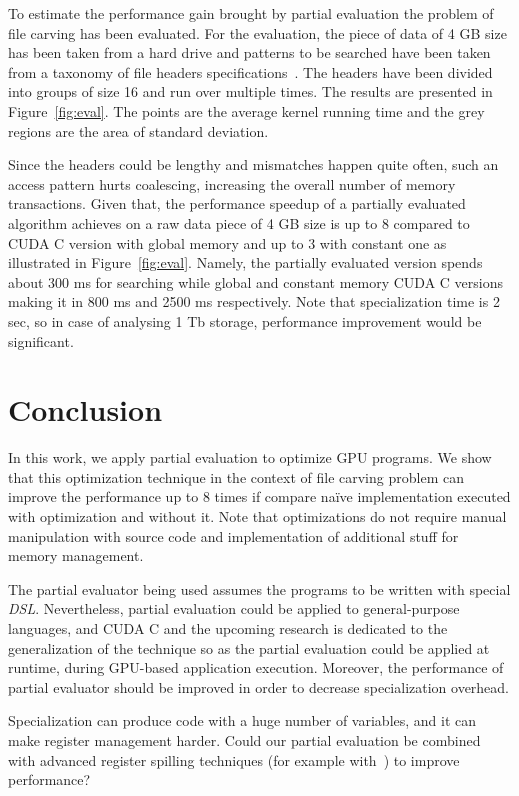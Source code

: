 \documentclass[sigplan,review,anonymous]{acmart}\settopmatter{printfolios=true,printccs=false,printacmref=false}
\begin{document}
To estimate the performance gain brought by partial evaluation the problem of file carving has been evaluated.
For the evaluation, the piece of data of 4 GB size has been taken from a hard drive and patterns to be searched have been taken from a taxonomy of file headers specifications~\cite{Headers}.
The headers have been divided into groups of size 16 and run over multiple times.
The results are presented in Figure~\ref{fig:eval}.
The points are the average kernel running time and the grey regions are the area of standard deviation.   

Since the headers could be lengthy and mismatches happen quite often, such an access pattern hurts coalescing, increasing the overall number of memory transactions. 
Given that, the performance speedup of a partially evaluated algorithm achieves on a raw data piece of 4 GB size is up to $8$ compared to CUDA C version with global memory and up to $3$ with constant one as illustrated in Figure~\ref{fig:eval}. Namely, the partially evaluated version spends about 300 ms for searching while global and constant memory CUDA C versions making it in 800 ms and 2500 ms respectively.  
Note that specialization time is 2 sec, so in case of analysing 1 Tb storage, performance improvement would be significant. 


\section{Conclusion}
In this work, we apply partial evaluation to optimize GPU programs.
We show that this optimization technique in the context of file carving problem can improve the performance up to $8$ times if compare na\"ive implementation executed with optimization and without it.
Note that optimizations do not require manual manipulation with source code and implementation of additional stuff for memory management.
  
The partial evaluator being used assumes the programs to be written with special \textit{DSL}.
Nevertheless, partial evaluation could be applied to general-purpose languages, and CUDA C and the upcoming research is dedicated to the generalization of the technique so as the partial evaluation could be applied at runtime, during GPU-based application execution.
Moreover, the performance of partial evaluator should be improved in order to decrease specialization overhead.

Specialization can produce code with a huge number of variables, and it can make register management harder. 
Could our partial evaluation be combined with advanced register spilling techniques (for example with~\cite{Sakdhnagool2019RegDemIG}) to improve performance?
\end{document}
